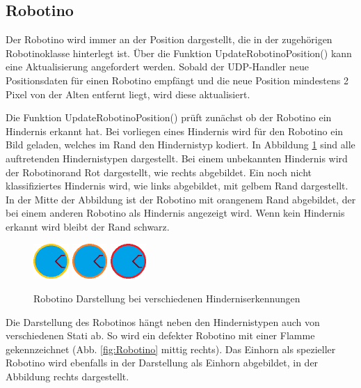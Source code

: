 \subsection{Robotino}

Der Robotino wird immer an der Position dargestellt, die in der zugehörigen Robotinoklasse hinterlegt ist. Über die Funktion UpdateRobotinoPosition() kann eine Aktualisierung angefordert werden. Sobald der UDP-Handler neue Positionsdaten für einen Robotino empfängt und die neue Position mindestens 2 Pixel von der Alten entfernt liegt, wird diese aktualisiert. 

Die Funktion UpdateRobotinoPosition() prüft zunächst ob der Robotino ein Hindernis erkannt hat. Bei vorliegen eines Hindernis wird für den Robotino ein Bild geladen, welches im Rand den Hindernistyp kodiert. In Abbildung \ref{fig:RobotinoHindernis} sind alle auftretenden Hindernistypen dargestellt. Bei einem unbekannten Hindernis wird der Robotinorand Rot dargestellt, wie rechts abgebildet. Ein noch nicht klassifiziertes Hindernis wird, wie links abgebildet, mit gelbem Rand dargestellt. In der Mitte der Abbildung ist der Robotino mit orangenem Rand abgebildet, der bei einem anderen Robotino als Hindernis angezeigt wird.
Wenn kein Hindernis erkannt wird bleibt der Rand schwarz. 

\begin{figure}[htb]
    \centering
    \includegraphics[width=0.12\textwidth]{Abbildungen/RobotinoGoffenRandGelb.png}
    \includegraphics[width=0.12\textwidth]{Abbildungen/RobotinoGoffenRandOrange.png}
    \includegraphics[width=0.12\textwidth]{Abbildungen/RobotinoGoffenRandRot.png}
    \caption{Robotino Darstellung bei verschiedenen Hinderniserkennungen}		
    \label{fig:RobotinoHindernis}
\end{figure}

Die Darstellung des Robotinos hängt neben den Hindernistypen auch von verschiedenen Stati ab. So wird ein defekter Robotino mit einer Flamme gekennzeichnet (Abb. \ref{fig:Robotino} mittig rechts). Das Einhorn als spezieller Robotino wird ebenfalls in der Darstellung als Einhorn abgebildet, in der Abbildung rechts dargestellt. 

